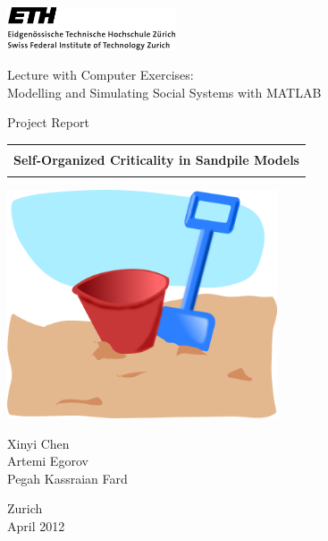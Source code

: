 
\thispagestyle{empty}

\begin{center}
\includegraphics[width=5cm]{ETHlogo.png}

\bigskip


\bigskip


\bigskip


\LARGE{ 	Lecture with Computer Exercises:\\ }
\LARGE{ Modelling and Simulating Social Systems with MATLAB\\}

\bigskip

\bigskip

\small{Project Report}\\

\bigskip





\begin{tabular}{|c|}
\hline
\\
\textbf{\LARGE{Self-Organized Criticality in Sandpile Models}}\\
\\
\hline
\end{tabular}
\bigskip

\bigskip

\bigskip

\includegraphics[width=8cm]{addon_bucket_and_spade.png}


\bigskip

\bigskip

\bigskip


\LARGE{Xinyi Chen \\ Artemi Egorov \\ Pegah Kassraian Fard}





\bigskip

\bigskip




Zurich\\
April 2012\\

\end{center}


